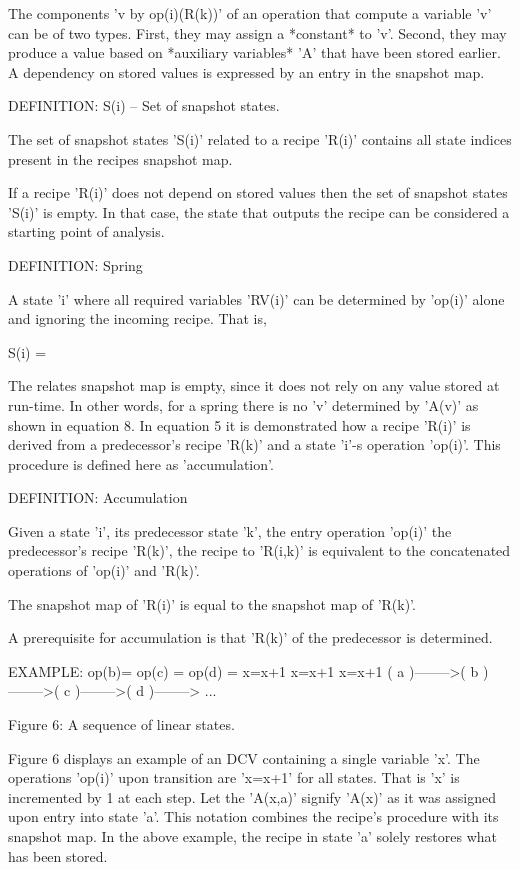 \documentclass[12pt]{article}
\begin{document}
The components 'v by op(i)(R(k))' of an operation that compute a variable 'v'
can be of two types. First, they may assign a *constant* to 'v'. Second, they may
produce a value based on *auxiliary variables* 'A' that have been stored earlier.
A dependency on stored values is expressed by an entry in the snapshot map.

DEFINITION: S(i) -- Set of snapshot states.

   The set of snapshot states 'S(i)' related to a recipe 'R(i)' contains
   all state indices present in the recipes snapshot map.

If a recipe 'R(i)' does not depend on stored values then the set of snapshot
states 'S(i)' is empty. In that case, the state that outputs the recipe can 
be considered a starting point of analysis.

DEFINITION: Spring

    A state 'i' where all required variables 'RV(i)' can be determined by 
    'op(i)' alone and ignoring the incoming recipe. That is, 

                          S(i) = \emptyset

The relates snapshot map is empty, since it does not rely on any value stored
at run-time.  In other words, for a spring there is no 'v' determined by 'A(v)'
as shown in equation 8.  In equation 5 it is demonstrated how a recipe 'R(i)'
is derived from a predecessor's recipe 'R(k)' and a state 'i'-s operation
'op(i)'. This procedure is defined here as 'accumulation'.

DEFINITION: Accumulation

    Given a state 'i', its predecessor state 'k', the entry operation 'op(i)'
    the predecessor's recipe 'R(k)', the recipe to 'R(i,k)' is equivalent
    to the concatenated operations of 'op(i)' and 'R(k)'.

    The snapshot map of 'R(i)' is equal to the snapshot map of 'R(k)'.

    A prerequisite for accumulation is that 'R(k)' of the predecessor is 
    determined.

EXAMPLE:
                  op(b)=        op(c) =      op(d) =
                    x=x+1         x=x+1         x=x+1        
            ( a )-------->( b )-------->( c )-------->( d )--------> ...


                  Figure 6: A sequence of linear states.


Figure 6 displays an example of an DCV containing a single variable 'x'. The
operations 'op(i)' upon transition are 'x=x+1' for all states. That is 'x' is
incremented by 1 at each step. Let the 'A(x,a)' signify 'A(x)' as it was
assigned upon entry into state 'a'. This notation combines the recipe's
procedure with its snapshot map. In the above example, the recipe in state 'a'
solely restores what has been stored.
\end{document}
